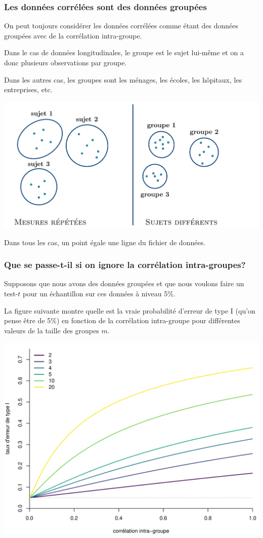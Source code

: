 \documentclass{beamer}
\begin{document}
\begin{frame}
\frametitle{Les données corrélées sont des données groupées}
\bi
\item On peut toujours considérer les données corrélées comme étant des données groupées avec de la corrélation intra-groupe.
\item Dans le cas de données longitudinales, le groupe est le sujet lui-même et on a donc plusieurs observations par groupe.
\item Dans les autres cas, les groupes sont les ménages, les écoles, les hôpitaux, les entreprises, etc.
\ei
\begin{center}
\includegraphics[width = 0.8\linewidth]{img/c5/06-correlated-groups_fr.pdf}
\end{center}
Dans tous les cas, un point égale une ligne du fichier de données.
\end{frame} 


\begin{frame}
\frametitle{Que se passe-t-il si on ignore la corrélation intra-groupes?}
\bi
\item Supposons que nous avons des données groupées et que nous voulons faire un test-$t$ pour un échantillon sur ces données à niveau 5\%.
\item La figure suivante montre quelle est la vraie probabilité d'erreur
de type I (qu'on pense être de 5\%) en fonction de la corrélation intra-groupe
pour différentes valeurs de la taille des groupes $m$. 
\begin{center}
\includegraphics[width = 0.65\linewidth]{img/c5/06-correlated-typeIerrorinf_fr.pdf}
\end{center}
\ei
\end{frame}
 
\end{document}
